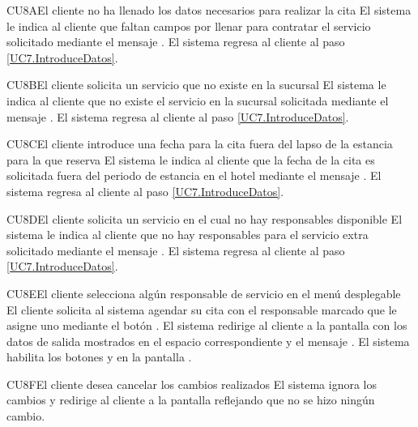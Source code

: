 \begin{UCtrayectoriaA}{CU8}{A}{El cliente no ha llenado los datos necesarios para realizar la cita}
	\UCpaso El sistema le indica al cliente que faltan campos por llenar para contratar el servicio solicitado mediante el mensaje .
	\UCpaso El sistema regresa al cliente al paso \ref{UC7.IntroduceDatos}.
\end{UCtrayectoriaA}
\begin{UCtrayectoriaA}{CU8}{B}{El cliente solicita un servicio que no existe en la sucursal}
	\UCpaso El sistema le indica al cliente que no existe el servicio en la sucursal solicitada mediante el mensaje .
	\UCpaso El sistema regresa al cliente al paso \ref{UC7.IntroduceDatos}.
\end{UCtrayectoriaA}
\begin{UCtrayectoriaA}{CU8}{C}{El cliente introduce una fecha para la cita fuera del lapso de la estancia para la que reserva}
	\UCpaso El sistema le indica al cliente que la fecha de la cita es solicitada fuera del periodo de estancia en el hotel mediante el mensaje .
	\UCpaso El sistema regresa al cliente al paso \ref{UC7.IntroduceDatos}.
\end{UCtrayectoriaA}
\begin{UCtrayectoriaA}{CU8}{D}{El cliente solicita un servicio en el cual no hay responsables disponible}
	\UCpaso El sistema le indica al cliente que no hay responsables para el servicio extra solicitado mediante el mensaje .
	\UCpaso El sistema regresa al cliente al paso \ref{UC7.IntroduceDatos}.
\end{UCtrayectoriaA}
\begin{UCtrayectoriaA}{CU8}{E}{El cliente selecciona algún responsable de servicio en el menú desplegable}
	\UCpaso[] El cliente solicita al sistema agendar su cita con el responsable marcado que le asigne uno mediante el botón .
	\UCpaso[] El sistema redirige al cliente a la pantalla  con los datos de salida mostrados en el espacio correspondiente y el mensaje .
	\UCpaso[] El sistema habilita los botones  y  en la pantalla .
\end{UCtrayectoriaA}
\begin{UCtrayectoriaA}{CU8}{F}{El cliente desea cancelar los cambios realizados}
	\UCpaso[] El sistema ignora los cambios y redirige al cliente a la pantalla  reflejando que no se hizo ningún cambio.
\end{UCtrayectoriaA}

